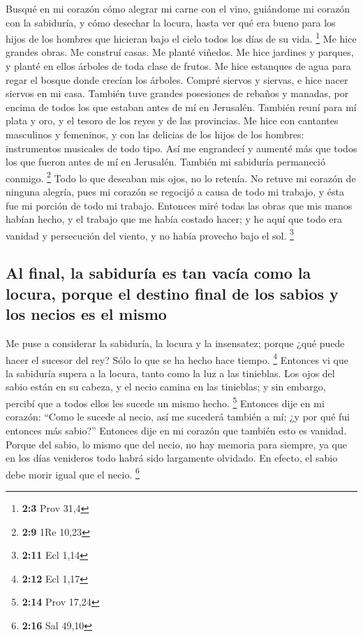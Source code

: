\begin{paracol}{2}
 Busqué en mi corazón cómo alegrar mi carne con el vino,
guiándome mi corazón con la sabiduría, y cómo desechar la locura, hasta
ver qué era bueno para los hijos de los hombres que hicieran bajo el
cielo todos los días de su vida. \footnote{\textbf{2:3} Prov 31,4}
 Me hice grandes obras. Me construí casas. Me planté
viñedos.  Me hice jardines y parques, y planté en ellos
árboles de toda clase de frutos.  Me hice estanques de
agua para regar el bosque donde crecían los árboles. 
Compré siervos y siervas, e hice nacer siervos en mi casa. También tuve
grandes posesiones de rebaños y manadas, por encima de todos los que
estaban antes de mí en Jerusalén.  También reuní para mí
plata y oro, y el tesoro de los reyes y de las provincias. Me hice con
cantantes masculinos y femeninos, y con las delicias de los hijos de los
hombres: instrumentos musicales de todo tipo.  Así me
engrandecí y aumenté más que todos los que fueron antes de mí en
Jerusalén. También mi sabiduría permaneció conmigo. \footnote{\textbf{2:9}
  1Re 10,23}  Todo lo que deseaban mis ojos, no lo
retenía. No retuve mi corazón de ninguna alegría, pues mi corazón se
regocijó a causa de todo mi trabajo, y ésta fue mi porción de todo mi
trabajo.  Entonces miré todas las obras que mis manos
habían hecho, y el trabajo que me había costado hacer; y he aquí que
todo era vanidad y persecución del viento, y no había provecho bajo el
sol. \footnote{\textbf{2:11} Ecl 1,14}

\hypertarget{al-final-la-sabiduruxeda-es-tan-vacuxeda-como-la-locura-porque-el-destino-final-de-los-sabios-y-los-necios-es-el-mismo}{%
\subsection{Al final, la sabiduría es tan vacía como la locura, porque
el destino final de los sabios y los necios es el
mismo}\label{al-final-la-sabiduruxeda-es-tan-vacuxeda-como-la-locura-porque-el-destino-final-de-los-sabios-y-los-necios-es-el-mismo}}

 Me puse a considerar la sabiduría, la locura y la
insensatez; porque ¿qué puede hacer el sucesor del rey? Sólo lo que se
ha hecho hace tiempo. \footnote{\textbf{2:12} Ecl 1,17} 
Entonces vi que la sabiduría supera a la locura, tanto como la luz a las
tinieblas.  Los ojos del sabio están en su cabeza, y el
necio camina en las tinieblas; y sin embargo, percibí que a todos ellos
les sucede un mismo hecho. \footnote{\textbf{2:14} Prov 17,24}
 Entonces dije en mi corazón: ``Como le sucede al necio,
así me sucederá también a mí; ¿y por qué fui entonces más sabio?''
Entonces dije en mi corazón que también esto es vanidad. 
Porque del sabio, lo mismo que del necio, no hay memoria para siempre,
ya que en los días venideros todo habrá sido largamente olvidado. En
efecto, el sabio debe morir igual que el necio. \footnote{\textbf{2:16}
  Sal 49,10}


\end{paracol}
